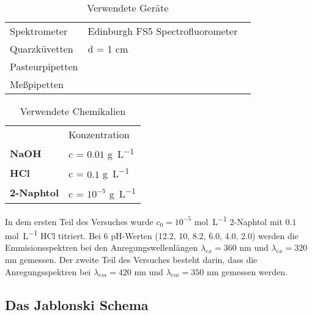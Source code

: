 \documentclass[12pt]{article}
\begin{document}
\begin{table}[!ht]
 \begin{tabular}{ll}
 Spektrometer & Edinburgh FS5 Spectrofluorometer ~\supercite{edin}   \\
 Quarzküvetten & d = 1 \si{\centi\meter}   \\
Pasteurpipetten & \\
Meßpipetten &    \\
\end{tabular}
\caption{Verwendete Geräte}
\end{table}

\begin{table}[!ht]
 \begin{tabular}{ll}
&Konzentration\\ 
\textbf{NaOH} & c = $0.01$ \si{\gram\per\liter}   \\
 \textbf{HCl} & c = $0.1$ \si{\gram\per\liter}   \\
 \textbf{2-Naphtol} & c = $10^{-5}$ \si{\gram\per\liter}   \\
\end{tabular}

\caption{Verwendete Chemikalien}
\end{table}

In dem ersten Teil des Versuches wurde $c_0 = 10^{-5}$ \si{\mol\per\liter} 2-Naphtol mit $0.1$ 
\si{\mol\per\liter} HCl titriert. Bei 6 pH-Werten (12.2, 10, 8.2, 6.0, 4.0, 2.0) werden die Emmisionsspektren 
bei den Anregungswellenlängen $\lambda_{ex}=360$ \si{\nano\meter} und $\lambda_{ex}=320$ \si{\nano\meter} gemessen.
Der zweite Teil des Versuches besteht darin, dass die Anregungsspektren bei  
   $\lambda_{em}=420$ \si{\nano\meter} und $\lambda_{em}=350$ \si{\nano\meter} gemessen werden.


\subsection{Das Jablonski Schema} %
\label{sub:jablonski_schema}
\end{document}
